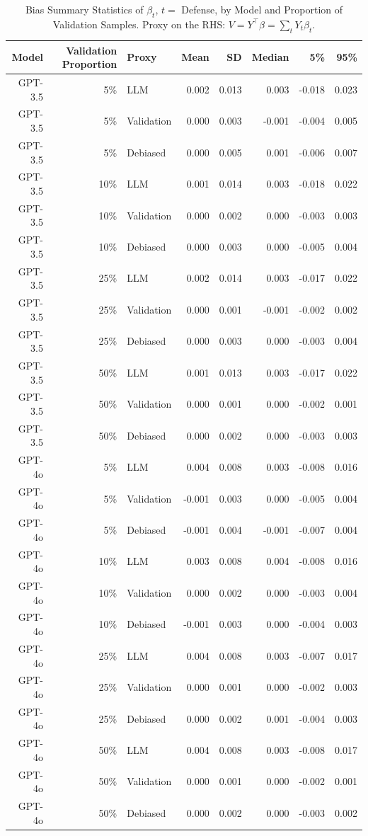 \begin{table}

\caption{Bias Summary Statistics of $\beta_{t}$, $t=$ Defense, by Model and Proportion of Validation Samples. Proxy on the RHS: $V = Y^\top \beta = \sum_{t} Y_t \beta_t$.}
\centering
\begin{tabular}[t]{rrlrrrrr}
\toprule
Model & Validation Proportion & Proxy & Mean & SD & Median & 5\% & 95\%\\
\midrule
GPT-3.5 & 5\% & LLM & 0.002 & 0.013 & 0.003 & -0.018 & 0.023\\
GPT-3.5 & 5\% & Validation & 0.000 & 0.003 & -0.001 & -0.004 & 0.005\\
GPT-3.5 & 5\% & Debiased & 0.000 & 0.005 & 0.001 & -0.006 & 0.007\\
GPT-3.5 & 10\% & LLM & 0.001 & 0.014 & 0.003 & -0.018 & 0.022\\
GPT-3.5 & 10\% & Validation & 0.000 & 0.002 & 0.000 & -0.003 & 0.003\\
GPT-3.5 & 10\% & Debiased & 0.000 & 0.003 & 0.000 & -0.005 & 0.004\\
GPT-3.5 & 25\% & LLM & 0.002 & 0.014 & 0.003 & -0.017 & 0.022\\
GPT-3.5 & 25\% & Validation & 0.000 & 0.001 & -0.001 & -0.002 & 0.002\\
GPT-3.5 & 25\% & Debiased & 0.000 & 0.003 & 0.000 & -0.003 & 0.004\\
GPT-3.5 & 50\% & LLM & 0.001 & 0.013 & 0.003 & -0.017 & 0.022\\
GPT-3.5 & 50\% & Validation & 0.000 & 0.001 & 0.000 & -0.002 & 0.001\\
GPT-3.5 & 50\% & Debiased & 0.000 & 0.002 & 0.000 & -0.003 & 0.003\\
GPT-4o & 5\% & LLM & 0.004 & 0.008 & 0.003 & -0.008 & 0.016\\
GPT-4o & 5\% & Validation & -0.001 & 0.003 & 0.000 & -0.005 & 0.004\\
GPT-4o & 5\% & Debiased & -0.001 & 0.004 & -0.001 & -0.007 & 0.004\\
GPT-4o & 10\% & LLM & 0.003 & 0.008 & 0.004 & -0.008 & 0.016\\
GPT-4o & 10\% & Validation & 0.000 & 0.002 & 0.000 & -0.003 & 0.004\\
GPT-4o & 10\% & Debiased & -0.001 & 0.003 & 0.000 & -0.004 & 0.003\\
GPT-4o & 25\% & LLM & 0.004 & 0.008 & 0.003 & -0.007 & 0.017\\
GPT-4o & 25\% & Validation & 0.000 & 0.001 & 0.000 & -0.002 & 0.003\\
GPT-4o & 25\% & Debiased & 0.000 & 0.002 & 0.001 & -0.004 & 0.003\\
GPT-4o & 50\% & LLM & 0.004 & 0.008 & 0.003 & -0.008 & 0.017\\
GPT-4o & 50\% & Validation & 0.000 & 0.001 & 0.000 & -0.002 & 0.001\\
GPT-4o & 50\% & Debiased & 0.000 & 0.002 & 0.000 & -0.003 & 0.002\\
\bottomrule
\end{tabular}
\end{table}
